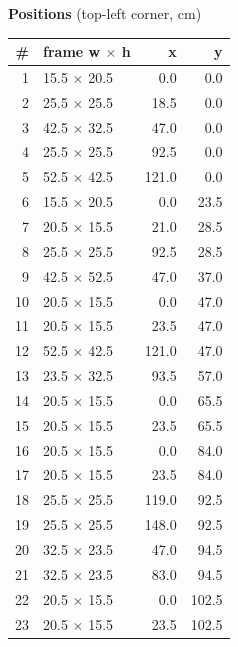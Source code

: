 \documentclass[a4paper,landscape,10pt]{article}
\begin{document}
\begin{minipage}[t]{0.25\textwidth}
\vspace{8pt}
{\bfseries Positions} (top-left corner, cm)\\[2pt]
\tiny
\begin{tabular}{@{}r l r r@{}}
\toprule
\# & frame w $\times$ h & x & y \\
\midrule
1 & 15.5 $\times$ 20.5 & 0.0 & 0.0 \\
2 & 25.5 $\times$ 25.5 & 18.5 & 0.0 \\
3 & 42.5 $\times$ 32.5 & 47.0 & 0.0 \\
4 & 25.5 $\times$ 25.5 & 92.5 & 0.0 \\
5 & 52.5 $\times$ 42.5 & 121.0 & 0.0 \\
6 & 15.5 $\times$ 20.5 & 0.0 & 23.5 \\
7 & 20.5 $\times$ 15.5 & 21.0 & 28.5 \\
8 & 25.5 $\times$ 25.5 & 92.5 & 28.5 \\
9 & 42.5 $\times$ 52.5 & 47.0 & 37.0 \\
10 & 20.5 $\times$ 15.5 & 0.0 & 47.0 \\
11 & 20.5 $\times$ 15.5 & 23.5 & 47.0 \\
12 & 52.5 $\times$ 42.5 & 121.0 & 47.0 \\
13 & 23.5 $\times$ 32.5 & 93.5 & 57.0 \\
14 & 20.5 $\times$ 15.5 & 0.0 & 65.5 \\
15 & 20.5 $\times$ 15.5 & 23.5 & 65.5 \\
16 & 20.5 $\times$ 15.5 & 0.0 & 84.0 \\
17 & 20.5 $\times$ 15.5 & 23.5 & 84.0 \\
18 & 25.5 $\times$ 25.5 & 119.0 & 92.5 \\
19 & 25.5 $\times$ 25.5 & 148.0 & 92.5 \\
20 & 32.5 $\times$ 23.5 & 47.0 & 94.5 \\
21 & 32.5 $\times$ 23.5 & 83.0 & 94.5 \\
22 & 20.5 $\times$ 15.5 & 0.0 & 102.5 \\
23 & 20.5 $\times$ 15.5 & 23.5 & 102.5 \\
\bottomrule
\end{tabular}
\end{minipage}
\clearpage
\end{document}
